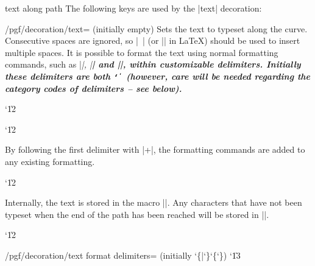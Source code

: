 \begin{decoration}{text along path}
    The following keys are used by the |text| decoration:
    \begin{key}{/pgf/decoration/text= (initially \normalfont empty)}
        Sets the text to typeset along the curve. Consecutive spaces are
        ignored, so |\ | (or |\space| in \LaTeX) should be used to insert
        multiple spaces. It is possible to format the text using normal
        formatting commands, such as |\it|, |\bf| and |\color|, within
        customizable delimiters. Initially these delimiters are both
        {\tt\char`\|} (however, care will be needed regarding the category
        codes of delimiters -- see below).
{\catcode`\|12
\begin{codeexample}[preamble={\usetikzlibrary{decorations.text}}]
\catcode`\|12
\end{codeexample}
}
        By following the first delimiter with |+|, the formatting commands are
        added to any existing formatting.
{\catcode`\|12
\begin{codeexample}[preamble={\usetikzlibrary{decorations.text}}]
\end{codeexample}
}

        Internally, the text is stored in the macro |\pgfdecorationtext|. Any
        characters that have not been typeset when the end of the path has been
        reached will be stored in |\pgfdecorationrestoftext|.
    \end{key}

{\catcode`\|12
    \begin{key}{/pgf/decoration/text format delimiters= (initially \char`\{|\char`\}\char`\{\char`\})}
            \catcode`\|13


\end{key}}
\end{decoration}
